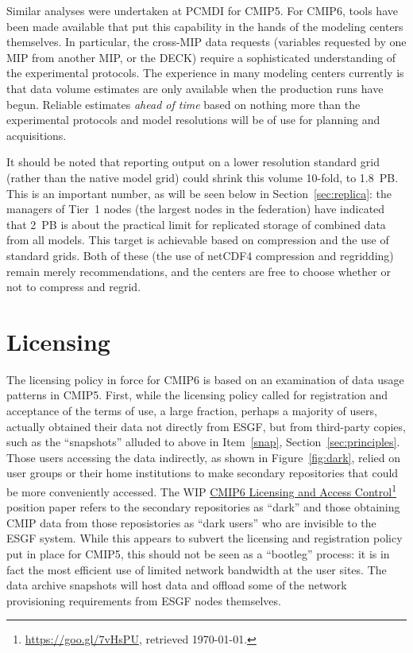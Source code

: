 \documentclass[gmd,manuscript]{copernicus}
\newcommand{\pllabel}[1]{\label{p-#1}\linelabel{l-#1}}
\newcommand{\urlref}[2] {\href{#1}{#2}\footnote{\url{#1}, retrieved \today.}}
\begin{document}
Similar analyses were undertaken at PCMDI for CMIP5. For CMIP6, tools
have been made available that put this capability in the hands of the
modeling centers themselves.
\pllabel{RC1-26}
In particular, the cross-MIP data requests (variables requested by one
MIP from another MIP, or the DECK) require a sophisticated
understanding of the experimental protocols. The experience in many
modeling centers currently is that data volume estimates are only
available when the production runs have begun. Reliable estimates
\emph{ahead of time} based on nothing more than the experimental
protocols and model resolutions will be of use for planning and
acquisitions.

It should be noted that reporting output on a lower resolution
standard grid (rather than the native model grid) could shrink this
volume 10-fold, to 1.8~PB. This is an important number, as will be
seen below in Section~\ref{sec:replica}: the managers of Tier~1 nodes
\pllabel{RC3-18}
(the largest nodes in the federation) have indicated that 2~PB is
about the practical limit for replicated storage of combined data from
all models.
This target is achievable based on compression and the use of standard
grids. Both of these (the use of netCDF4 compression and regridding)
remain merely recommendations, and the centers are free to choose
whether or not to compress and regrid.

\section{Licensing}
\label{sec:licensing}

The licensing policy in force for CMIP6 is based on an examination of
data usage patterns in CMIP5. First, while the licensing policy called
for registration and acceptance of the terms of use, a large fraction,
perhaps a majority of users, actually obtained their data not directly
from ESGF, but from
\pllabel{RC1-33}
third-party copies, such as the ``snapshots'' alluded to above in
Item~\ref{snap}, Section~\ref{sec:principles}. Those users accessing
the data indirectly, as shown in Figure~\ref{fig:dark}, relied on user
groups or their home institutions to make secondary repositories that
could be more conveniently accessed. The WIP
\urlref{https://goo.gl/7vHsPU}{CMIP6 Licensing and Access Control}
position paper refers to the secondary repositories as ``dark'' and
those obtaining CMIP data from those reposistories as ``dark users''
who are invisible to the ESGF system. While this appears to subvert
the licensing and registration policy put in place for CMIP5, this
should not be seen as a ``bootleg'' process: it is in fact the most
efficient use of limited network bandwidth at the user sites.
\pllabel{RC2-29}
The data archive snapshots will host data and offload some of the
network provisioning requirements from ESGF nodes themselves.
\end{document}
